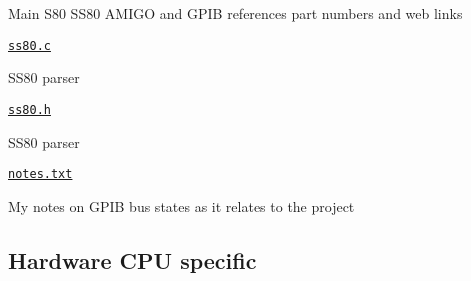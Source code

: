 \begin{DoxyItemize}
\begin{DoxyItemize}
\begin{DoxyItemize}
\item Main S80 S\+S80 A\+M\+I\+GO and G\+P\+IB references part numbers and web links
\end{DoxyItemize}
\item \href{gpib/ss80.c}{\tt ss80.\+c}
\begin{DoxyItemize}
\item S\+S80 parser
\end{DoxyItemize}
\item \href{gpib/ss80.h}{\tt ss80.\+h}
\begin{DoxyItemize}
\item S\+S80 parser
\end{DoxyItemize}
\item \href{gpib/notes.txt}{\tt notes.\+txt}
\begin{DoxyItemize}
\item My notes on G\+P\+IB bus states as it relates to the project
\end{DoxyItemize}
\end{DoxyItemize}
\end{DoxyItemize}

\subsection*{Hardware C\+PU specific}


